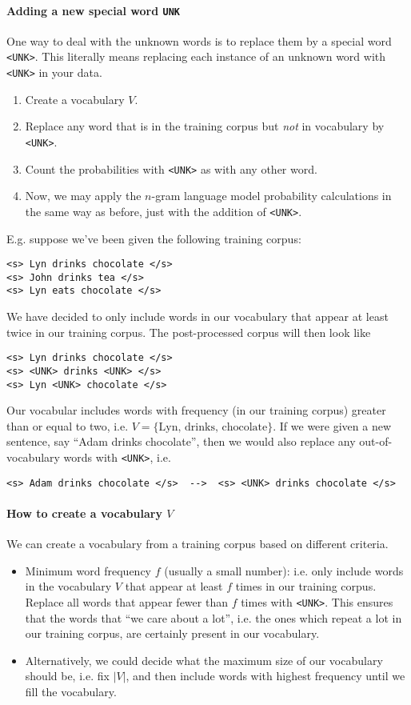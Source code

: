 \documentclass[12pt]{article}
\begin{document}
\paragraph{Adding a new special word \texttt{UNK}} One way to deal with the unknown words is to replace them by a special word \texttt{<UNK>}. This literally means replacing each instance of an unknown word with \texttt{<UNK>} in your data.
\begin{enumerate}
\item Create a vocabulary $V$.
\item Replace any word that is in the training corpus but \emph{not} in     vocabulary by \texttt{<UNK>}.
\item Count the probabilities with \texttt{<UNK>} as with any other word.
\item Now, we may apply the $n$-gram language model probability calculations in the same way as before, just with the addition of \texttt{<UNK>}.
\end{enumerate}
E.g. suppose we've been given the following training corpus:
\begin{verbatim}
<s> Lyn drinks chocolate </s>
<s> John drinks tea </s>
<s> Lyn eats chocolate </s>
\end{verbatim}
We have decided to only include words in our vocabulary that appear at least twice in our training corpus. The post-processed corpus will then look like
\begin{verbatim}
<s> Lyn drinks chocolate </s>
<s> <UNK> drinks <UNK> </s>
<s> Lyn <UNK> chocolate </s>
\end{verbatim}
Our vocabular includes words with frequency (in our training corpus) greater than or equal to two, i.e. $V = \{\textrm{Lyn, drinks, chocolate}\}$.
If we were given a new sentence, say ``Adam drinks chocolate'', then we would also replace any out-of-vocabulary words with \texttt{<UNK>}, i.e.
\begin{verbatim}
<s> Adam drinks chocolate </s>  -->  <s> <UNK> drinks chocolate </s>
\end{verbatim}

\paragraph{How to create a vocabulary $V$} We can create a vocabulary from a training corpus based on different criteria.

\begin{itemize}
\item Minimum word frequency $f$ (usually a small number): i.e. only include words in the vocabulary $V$ that appear at least $f$ times in our training corpus. Replace all words that appear fewer than $f$ times with \texttt{<UNK>}. This ensures that the words that ``we care about a lot'', i.e. the ones which repeat a lot in our training corpus, are certainly present in our vocabulary.
\item Alternatively, we could decide what the maximum size of our vocabulary should be, i.e. fix $|V|$, and then include words with highest frequency until we fill the vocabulary.
\end{itemize}
\end{document}
